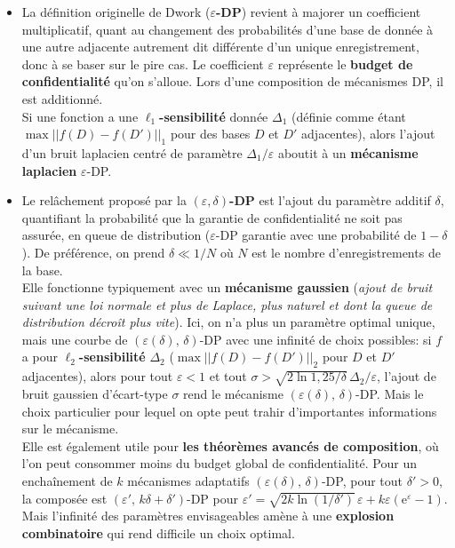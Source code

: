 \documentclass[a4paper,11pt]{article} %
\newcommand{\evid}[1]{\colorbox{blue!10}{\textbf{#1}}}
\begin{document}
\begin{itemize}
    \item 
    La définition originelle de Dwork (\evid{$\varepsilon$-DP}) revient à majorer un coefficient multiplicatif, quant au changement des probabilités d'une base de donnée à une autre \og adjacente\fg{} autrement dit différente d'un unique enregistrement, donc à se baser sur le pire cas. Le coefficient $\varepsilon$ représente le \evid{budget de} \evid{confidentialité} qu'on s'alloue. Lors d'une composition de mécanismes DP, il est additionné.\\
    Si une fonction a une \evid{$\ell_1$-sensibilité} donnée $\Delta_1$ (définie comme étant $\max||f(D)-f(D')||_1$ pour des bases $D$ et $D'$ adjacentes), alors l'ajout d'un bruit laplacien centré de paramètre $\Delta_1/\varepsilon$ aboutit à un \textbf{mécanisme laplacien} $\varepsilon$-DP.
    \item 
    Le relâchement proposé par la \evid{$(\varepsilon,\delta)$-DP} est l'ajout du paramètre additif $\delta$, quantifiant la probabilité que la garantie de confidentialité ne soit pas assurée, en queue de distribution (\og $\varepsilon$-DP garantie avec une probabilité de $1-\delta$\fg{}). De préférence, on prend $\delta \ll 1/N$ où $N$ est le nombre d'enregistrements de la base.\\
    Elle fonctionne typiquement avec un \textbf{mécanisme gaussien} (\emph{ajout de bruit suivant une loi normale et plus de Laplace, plus \og naturel\fg{} et dont la queue de distribution décroît plus vite}). Ici, on n'a plus un paramètre optimal unique, mais une \og courbe\fg{} de $(\varepsilon(\delta),\, \delta)$-DP avec une infinité de choix possibles: si $f$ a pour \evid{$\ell_2$-sensibilité} $\Delta_2$ ($\max||f(D)-f(D')||_2$ pour $D$ et $D'$ adjacentes), alors pour tout $\varepsilon<1$ et tout $\sigma > \sqrt{2\ln 1,25/\delta}\,\Delta_2/\varepsilon$, l'ajout de bruit gaussien d'écart-type $\sigma$ rend le mécanisme $(\varepsilon(\delta),\, \delta)$-DP. Mais le choix particulier pour lequel on opte peut trahir d'importantes informations sur le mécanisme.\\
    Elle est également utile pour \textbf{les théorèmes avancés de composition}, où l'on peut consommer moins du budget global de confidentialité. Pour un enchaînement de $k$ mécanismes adaptatifs $(\varepsilon(\delta),\, \delta)$-DP, pour tout $\delta'>0$, la composée est $(\varepsilon',\,k\delta+\delta')$-DP pour $\varepsilon' = \sqrt{2k\ln(1/\delta')}\,\varepsilon+k\varepsilon(\text{e}^\varepsilon-1)$.
    Mais l'infinité des paramètres envisageables amène à une \textbf{explosion combinatoire} qui rend difficile un choix optimal.

\end{itemize}
\end{document}
